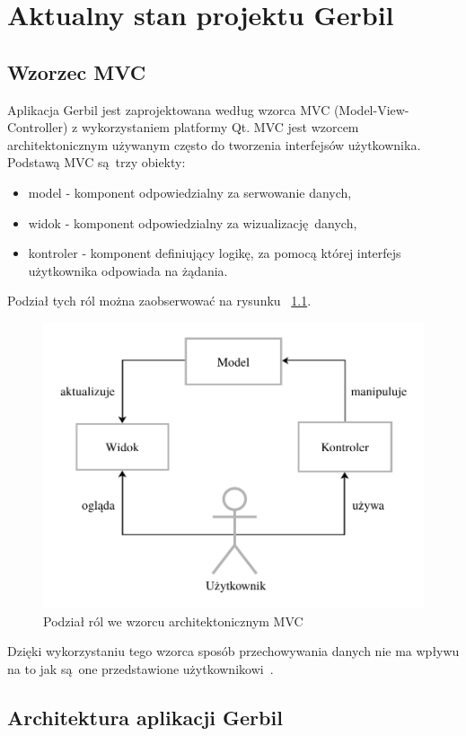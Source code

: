 \chapter{Aktualny stan projektu Gerbil}

 \section{Wzorzec MVC}

Aplikacja Gerbil jest zaprojektowana według wzorca MVC (Model-View-Controller) z wykorzystaniem platformy Qt. MVC jest wzorcem architektonicznym używanym często do tworzenia interfejsów użytkownika. Podstawą MVC są trzy obiekty:
\begin{itemize}
	\item model - komponent odpowiedzialny za serwowanie danych,
	\item widok - komponent odpowiedzialny za wizualizację danych,
	\item kontroler - komponent definiujący logikę, za pomocą której interfejs użytkownika odpowiada na żądania.
\end{itemize}
Podział tych ról można zaobserwować na rysunku ~\ref{fig:mvc}.

\begin{figure}[ht]
	\centering
	\includegraphics[width=0.7\linewidth]{rys04/mvc}
	\caption{Podział ról we wzorcu architektonicznym MVC}
	\label{fig:mvc}	
\end{figure}

Dzięki wykorzystaniu tego wzorca sposób przechowywania danych nie ma wpływu na to jak są one przedstawione użytkownikowi~\cite{Qtdoc}.

\section {Architektura aplikacji Gerbil}

